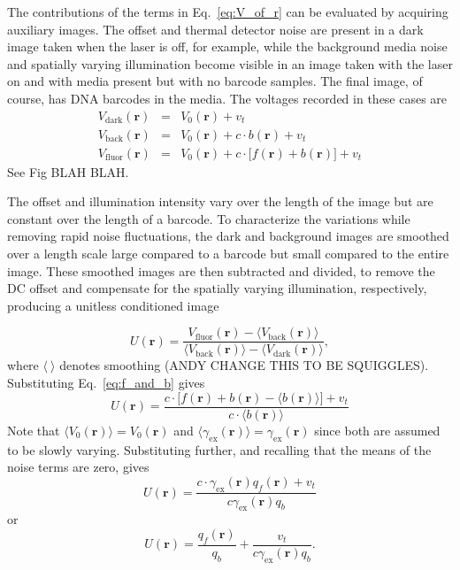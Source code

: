 The contributions of the terms in Eq.~\ref{eq:V_of_r} can be evaluated by acquiring auxiliary images. The offset and thermal detector noise are present in a dark image taken when the laser is off, for example, while the background media noise and spatially varying illumination become visible in an image taken with the laser on and with media present but with no barcode samples. The final image, of course, has DNA barcodes in the media. The voltages recorded in these cases are
\begin{eqnarray}
V_{\text{dark}}(\mathbf{r})&=&V_0(\mathbf{r})+v_t\\
V_{\text{back}}(\mathbf{r})&=&V_0(\mathbf{r})+c \cdot  b(\mathbf{r})  +v_t\\
V_{\text{fluor}}(\mathbf{r})&=&V_0(\mathbf{r})+c \cdot \big[ f(\mathbf{r}) + b(\mathbf{r})\big]  +v_t
\end{eqnarray}
See Fig BLAH BLAH. 

The offset and illumination intensity vary over the length of the image but are constant over the length of a barcode. To characterize the variations while removing rapid noise fluctuations, the dark and background images are smoothed over a length scale large compared to a barcode but small compared to the entire image. These smoothed images are then subtracted and divided, to remove the DC offset and compensate for the spatially varying illumination, respectively, producing a unitless conditioned image

\begin{equation}
U(\mathbf{r})= \frac{ V_{\text{fluor}}(\mathbf{r}) - \langle V_{\text{back}}(\mathbf{r}) \rangle }{ \langle V_{\text{back}}(\mathbf{r}) \rangle - \langle V_{\text{dark}}(\mathbf{r}) \rangle},
\end{equation}
where $\langle~\rangle$ denotes smoothing (ANDY CHANGE THIS TO BE SQUIGGLES). Substituting Eq.~\ref{eq:f_and_b} gives
\begin{equation}
U(\mathbf{r})= \frac{ c \cdot \big[ f(\mathbf{r})  +b(\mathbf{r}) -\langle b(\mathbf{r}) \rangle \big]+ v_t  }{   c \cdot \langle b(\mathbf{r}) \rangle }
\end{equation}
Note that $\langle V_0(\mathbf{r}) \rangle = V_0(\mathbf{r})$ and $\langle \gamma_{\text{ex}}(\mathbf{r}) \rangle  = \gamma_{\text{ex}}(\mathbf{r})$ since both are assumed to be slowly varying. Substituting further, and recalling that the means of the noise terms are zero, gives
\begin{equation}
U(\mathbf{r})= \frac{ c \cdot \gamma_{\text{ex}}(\mathbf{r}) q_f(\mathbf{r})  + v_t  }{ c \gamma_{\text{ex}}(\mathbf{r})  q_b }
\end{equation}
or
\begin{equation}\label{eq:realDeal}
U(\mathbf{r})= \frac{ q_f(\mathbf{r}) }{ q_b}   + \frac{ v_t }{   c \gamma_{\text{ex}}(\mathbf{r}) q_b}.
\end{equation}



